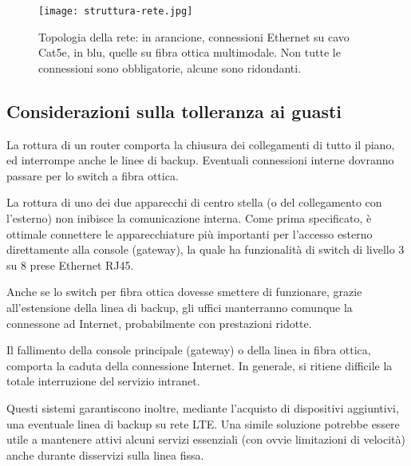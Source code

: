 \begin{figure}[ht]
  \centering
  \texttt{[image: struttura-rete.jpg]}
  \caption{
    Topologia della rete: in arancione, connessioni Ethernet su cavo Cat5e, in blu, quelle su fibra ottica multimodale. %
    Non tutte le connessioni sono obbligatorie, alcune sono ridondanti.
  }\label{fig:topologia}
\end{figure}

\newpage
\subsection{Considerazioni sulla tolleranza ai guasti}
La rottura di un router comporta la chiusura dei collegamenti di tutto il piano, ed interrompe anche
le linee di backup. Eventuali connessioni interne dovranno passare per lo switch a fibra ottica.

La rottura di uno dei due apparecchi di centro stella (o del collegamento con l'esterno) non inibisce la
comunicazione interna. Come prima specificato, è ottimale connettere le apparecchiature più importanti per l'accesso
esterno direttamente alla console (gateway), la quale ha funzionalità di switch di livello 3 su 8 prese Ethernet RJ45.

Anche se lo switch per fibra ottica dovesse smettere di funzionare, grazie all'estensione della linea di backup,
gli uffici manterranno comunque la connessone ad Internet, probabilmente con prestazioni ridotte.

Il fallimento della console principale (gateway) o della linea in fibra ottica, comporta la caduta della connessione Internet.
In generale, si ritiene difficile la totale interruzione del servizio intranet. 

Questi sistemi garantiscono inoltre, mediante l'acquisto di dispositivi aggiuntivi, una eventuale linea di backup
su rete LTE. Una simile soluzione potrebbe essere utile a mantenere attivi alcuni servizi essenziali (con ovvie limitazioni di velocità)
anche durante disservizi sulla linea fissa.
